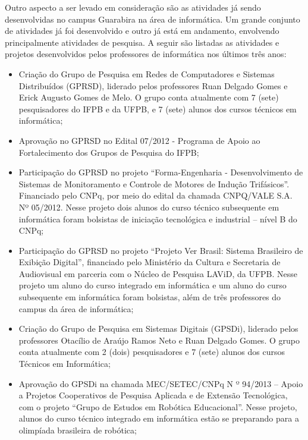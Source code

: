 	Outro aspecto a ser levado em consideração são as atividades já sendo desenvolvidas no campus Guarabira na área de informática. Um grande conjunto de atividades já foi desenvolvido e outro já está em andamento, envolvendo principalmente atividades de pesquisa. A seguir são listadas as atividades e projetos desenvolvidos pelos professores de informática nos últimos tr\^es anos:

\begin{itemize}
\item Criação do Grupo de Pesquisa em Redes de Computadores e Sistemas Distribuídos (GPRSD), liderado pelos professores Ruan Delgado Gomes e Erick Augusto Gomes de Melo. O grupo  conta atualmente com 7 (sete) pesquisadores do IFPB e da UFPB, e 7 (sete) alunos dos cursos técnicos em informática;

\item Aprovação no GPRSD no Edital 07/2012 - Programa de Apoio ao Fortalecimento dos Grupos de Pesquisa do IFPB;

\item Participação do GPRSD no projeto ``Forma-Engenharia - Desenvolvimento de Sistemas de Monitoramento e Controle de Motores de Indução Trifásicos''. Financiado pelo CNPq, por meio do edital da chamada CNPQ/VALE S.A. Nº 05/2012. Nesse projeto dois alunos do curso técnico subsequente em informática foram bolsistas de iniciação tecnológica e industrial – nível B do CNPq;

\item Participação do GPRSD no projeto ``Projeto Ver Brasil: Sistema Brasileiro de Exibição Digital'', financiado pelo Ministério da Cultura e Secretaria de Audiovisual em parceria com o Núcleo de Pesquisa LAViD, da UFPB. Nesse projeto um aluno do curso integrado em informática e um aluno do curso subsequente em informática foram bolsistas, além de três professores do campus da área de informática;

\item Criação do Grupo de Pesquisa em Sistemas Digitais (GPSDi), liderado pelos professores Otacílio de Araújo Ramos Neto e Ruan Delgado Gomes. O grupo conta atualmente com 2 (dois) pesquisadores e 7 (sete) alunos dos cursos Técnicos em Informática;

\item Aprovação do GPSDi na chamada MEC/SETEC/CNPq N º 94/2013 – Apoio a Projetos Cooperativos de Pesquisa Aplicada e de Extensão Tecnológica, com o projeto “Grupo de Estudos em Robótica Educacional”.  Nesse projeto, alunos do curso técnico integrado em informática estão se preparando para a olimpíada brasileira de robótica;


\end{itemize}

